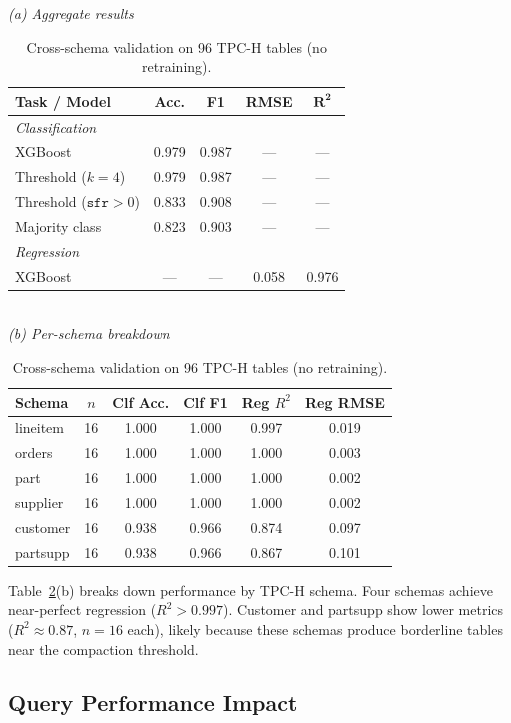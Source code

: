 \documentclass[conference, 10pt]{IEEEtran}
\begin{document}
\begin{table}[b]
\centering
\caption{Cross-schema validation on 96 TPC-H tables (no retraining).}
\label{tab:tpch}
\smallskip
\footnotesize
\textit{(a) Aggregate results}\\[2pt]
\begin{tabular}{lcccc}
\toprule
\textbf{Task / Model} & \textbf{Acc.} & \textbf{F1} & \textbf{RMSE} & $\bm{R^2}$ \\
\midrule
\multicolumn{5}{l}{\textit{Classification}} \\
\quad XGBoost         & 0.979 & 0.987 & --- & --- \\
\quad Threshold ($k{=}4$) & 0.979 & 0.987 & --- & --- \\
\quad Threshold ($\texttt{sfr}{>}0$) & 0.833 & 0.908 & --- & --- \\
\quad Majority class  & 0.823 & 0.903 & --- & --- \\
\midrule
\multicolumn{5}{l}{\textit{Regression}} \\
\quad XGBoost         & --- & --- & 0.058 & 0.976 \\
\bottomrule
\end{tabular}
\\[6pt]
\textit{(b) Per-schema breakdown}\\[2pt]
\begin{tabular}{lccccc}
\toprule
Schema & $n$ & Clf Acc. & Clf F1 & Reg $R^2$ & Reg RMSE \\
\midrule
lineitem & 16 & 1.000 & 1.000 & 0.997 & 0.019 \\
orders   & 16 & 1.000 & 1.000 & 1.000 & 0.003 \\
part     & 16 & 1.000 & 1.000 & 1.000 & 0.002 \\
supplier & 16 & 1.000 & 1.000 & 1.000 & 0.002 \\
customer & 16 & 0.938 & 0.966 & 0.874 & 0.097 \\
partsupp & 16 & 0.938 & 0.966 & 0.867 & 0.101 \\
\bottomrule
\end{tabular}
\end{table}

Table~\ref{tab:tpch}(b) breaks down performance by TPC-H schema.
Four schemas achieve near-perfect regression
($R^2 > 0.997$). Customer and partsupp show lower metrics
($R^2 \approx 0.87$, $n = 16$ each), likely because these schemas
produce borderline tables near the compaction threshold.

\subsection{Query Performance Impact}
\label{sec:querybench}
\end{document}

